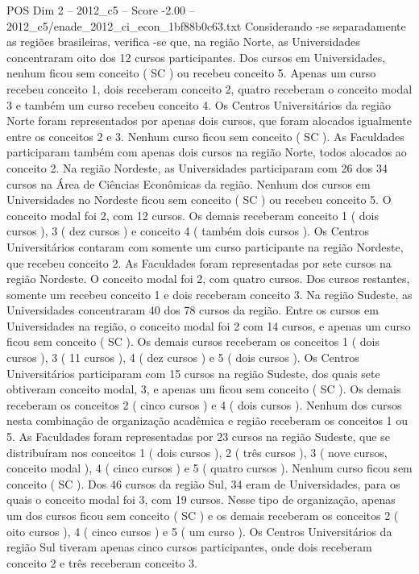 \begin{textsample}{POS Dim 2 – 2012\_c5 – Score -2.00 – 2012\_c5/enade\_2012\_ci\_econ\_1bf88b0c63.txt}
Considerando -se separadamente as regiões brasileiras, verifica -se que, na região Norte, as Universidades concentraram oito dos 12 cursos participantes.
Dos cursos em Universidades, nenhum ficou sem conceito ( SC ) ou recebeu conceito 5.
Apenas um curso recebeu conceito 1, dois receberam conceito 2, quatro receberam o conceito modal 3 e também um curso recebeu conceito 4.
Os Centros Universitários da região Norte foram representados por apenas dois cursos, que foram alocados igualmente entre os conceitos 2 e 3.
Nenhum curso ficou sem conceito ( SC ).
As Faculdades participaram também com apenas dois cursos na região Norte, todos alocados ao conceito 2.
Na região Nordeste, as Universidades participaram com 26 dos 34 cursos na Área de Ciências Econômicas da região.
Nenhum dos cursos em Universidades no Nordeste ficou sem conceito ( SC ) ou recebeu conceito 5.
O conceito modal foi 2, com 12 cursos.
Os demais receberam conceito 1 ( dois cursos ), 3 ( dez cursos ) e conceito 4 ( também dois cursos ).
Os Centros Universitários contaram com somente um curso participante na região Nordeste, que recebeu conceito 2.
As Faculdades foram representadas por sete cursos na região Nordeste.
O conceito modal foi 2, com quatro cursos.
Dos cursos restantes, somente um recebeu conceito 1 e dois receberam conceito 3.
Na região Sudeste, as Universidades concentraram 40 dos 78 cursos da região.
Entre os cursos em Universidades na região, o conceito modal foi 2 com 14 cursos, e apenas um curso ficou sem conceito ( SC ).
Os demais cursos receberam os conceitos 1 ( dois cursos ), 3 ( 11 cursos ), 4 ( dez cursos ) e 5 ( dois cursos ).
Os Centros Universitários participaram com 15 cursos na região Sudeste, dos quais sete obtiveram conceito modal, 3, e apenas um ficou sem conceito ( SC ).
Os demais receberam os conceitos 2 ( cinco cursos ) e 4 ( dois cursos ).
Nenhum dos cursos nesta combinação de organização acadêmica e região receberam os conceitos 1 ou 5.
As Faculdades foram representadas por 23 cursos na região Sudeste, que se distribuíram nos conceitos 1 ( dois cursos ), 2 ( três cursos ), 3 ( nove cursos, conceito modal ), 4 ( cinco cursos ) e 5 ( quatro cursos ).
Nenhum curso ficou sem conceito ( SC ).
Dos 46 cursos da região Sul, 34 eram de Universidades, para os quais o conceito modal foi 3, com 19 cursos.
Nesse tipo de organização, apenas um dos cursos ficou sem conceito ( SC ) e os demais receberam os conceitos 2 ( oito cursos ), 4 ( cinco cursos ) e 5 ( um curso ).
Os Centros Universitários da região Sul tiveram apenas cinco cursos participantes, onde dois receberam conceito 2 e três receberam conceito 3.

\end{textsample}
